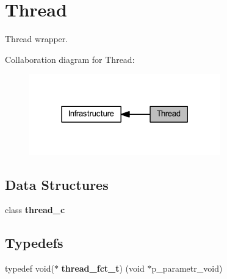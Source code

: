 \section{Thread}
\label{group___thread}


Thread wrapper.  


Collaboration diagram for Thread\+:\nopagebreak
\begin{figure}[H]
\begin{center}
\leavevmode
\includegraphics[width=235pt]{group___thread}
\end{center}
\end{figure}
\subsection*{Data Structures}
\begin{DoxyCompactItemize}
\item 
class \textbf{ thread\+\_\+c}
\end{DoxyCompactItemize}
\subsection*{Typedefs}
\begin{DoxyCompactItemize}
\item 
typedef void($\ast$ \textbf{ thread\+\_\+fct\+\_\+t}) (void $\ast$p\+\_\+parametr\+\_\+void)
\end{DoxyCompactItemize}

